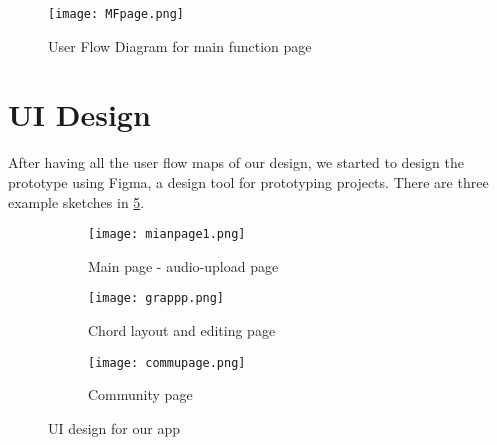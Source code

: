 \begin{figure}[ht]
\centering
\texttt{[image: MFpage.png]}
\caption{User Flow Diagram for main function page}
\label{flowchartmain}
\end{figure}
\section{UI Design}
After having all the user flow maps of our design, we started to design the prototype using Figma, a design tool for prototyping projects. 
There are three example sketches in \cref{fig:UIdesign}. 

\begin{figure}[ht]
     \centering
     \hspace{16mm}
     \begin{subfigure}[b]{0.2\textwidth}
         \centering
         \texttt{[image: mianpage1.png]}
         \caption{Main page - audio-upload page}
         \label{Mainpage}
     \end{subfigure}
     \hfill
     \begin{subfigure}[b]{0.2\textwidth}
         \centering
         \texttt{[image: grappp.png]}
         \caption{Chord layout and editing page}
         \label{chordedit}
     \end{subfigure}
     \hfill
     \begin{subfigure}[b]{0.2\textwidth}
         \centering
         \texttt{[image: commupage.png]}
         \caption{Community page}
         \label{Community page}
     \end{subfigure}
     \hspace{16mm}
        \caption{UI design for our app}
        \label{fig:UIdesign}
\end{figure}


